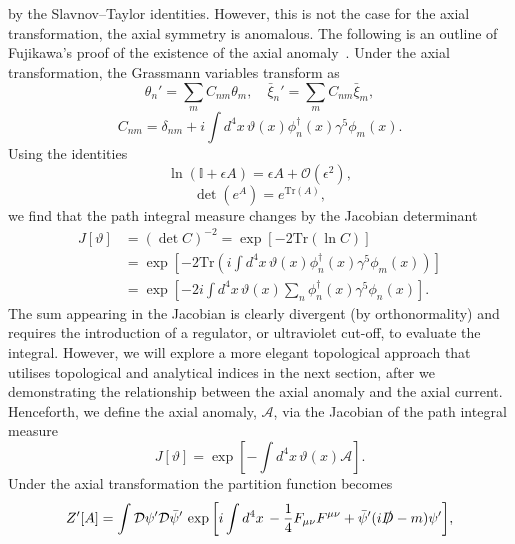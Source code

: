 \documentclass[11pt, a4paper]{article}
\begin{document}
by the Slavnov–Taylor identities.
However, this is not the case for the axial transformation,
the axial symmetry is anomalous. The following is an
outline of Fujikawa's proof of the existence of the axial anomaly~\cite{Fujikawa,Fujikawa2}.
Under the axial transformation, the Grassmann variables transform as
\begin{equation}
  \theta_n' = \sum_m{C_{nm} \theta_m}, \quad \bar{\xi}_n' = \sum_m{C_{nm} \bar{\xi}_m},
\end{equation}
\begin{equation}
  C_{nm} = \delta_{nm} +i\int{d^4x\, \vartheta(x)\phi_{n}^{\dagger}(x)\gamma^5\phi_m(x)}.
\end{equation}
Using the identities
\begin{equation}
  \ln{(\mathbb{I} + \epsilon A)} = \epsilon A + \mathcal{O}(\epsilon^2),
\end{equation}
\begin{equation}
  \det\left( e^{A}\right) = e^{\mathrm{Tr}(A)},
\end{equation}
we find that the path integral measure changes by the Jacobian determinant
\begin{equation}\label{eq:10}
  \begin{split}
  J[\vartheta] & = {(\det{C})}^{-2} = \exp\left[-2 \mathrm{Tr}(\ln{C}) \right] \\
   & = \exp{\left[-2\mathrm{Tr}\left(i
  \int{d^4x\,  \vartheta(x)\phi_{n}^{\dagger}(x)\gamma^5\phi_m(x)} \right) \right]} \\
   & = \exp{\left[ -2i
  \int{d^4x\,\vartheta(x) \sum_n{\phi_{n}^{\dagger}(x)\gamma^5\phi_n(x)}} \right]}.
  \end{split}
\end{equation}
The sum appearing in the Jacobian is clearly divergent (by orthonormality)
and requires the introduction of a regulator, or ultraviolet cut-off, to evaluate
the integral. However, we will explore a more elegant topological approach that utilises
topological and analytical indices in the next section,
after we demonstrating the relationship between the axial anomaly
and the axial current. Henceforth, we define the axial anomaly, $\mathcal{A}$,
via the Jacobian of the path integral measure
\begin{equation}
   J[\vartheta] = \exp{\left[ -\int{d^4x\,\vartheta(x) \mathcal{A} } \right]}.
\end{equation}
Under the axial transformation the partition function becomes
\begin{equation}
  Z'[A] = \int{\mathcal{D}\psi'\mathcal{D}\bar{\psi}'\,
  \exp{\left[ i \int{d^4x\, -\frac{1}{4}F_{\mu\nu}F^{\mu\nu} + \bar{\psi}'(i\slashed{D} -m)\psi'} \right]}},
\end{equation}
\end{document}
